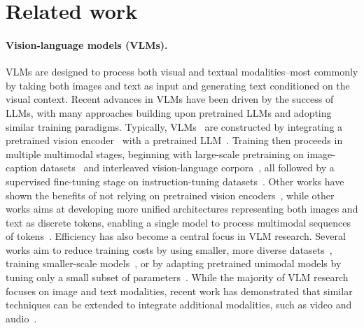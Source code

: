 \section{Related work}

\paragraph{Vision-language models (VLMs).} VLMs are designed to process both visual and textual modalities--most commonly by taking both images and text as input and generating text conditioned on the visual context. 
Recent advances in VLMs have been driven by the success of LLMs, with many approaches building upon pretrained LLMs and adopting similar training paradigms. 
Typically, VLMs~\citep{alayrac2022flamingo,laurenccon2024mattersidefics2,VILA} are constructed by integrating a pretrained vision encoder~\citep{radford2021learning,li2023siglip,fini2024multimodalaimv2} with a pretrained LLM~\citep{llama3_2modelcard,Mistral7B,wang2024qwen2}. 
Training then proceeds in multiple multimodal stages, beginning with large-scale pretraining on image-caption datasets~\citep{LAION-COCO,COYO-700M} and interleaved vision-language corpora~\citep{OBELICS,MMC4}, all followed by a supervised fine-tuning stage on instruction-tuning datasets~\citep{LLaVA-1.5,tong2024cambrian,laurenccon2024mattersidefics2}. 
Other works have shown the benefits of not relying on pretrained vision encoders~\citep{fuyu-8b,shukor2025scaling,diao2025evev2,diao2024unveiling}, while other works aims at developing more unified architectures representing both images and text as discrete tokens, enabling a single model to process multimodal sequences of tokens~\citep{wang2022ofa,shukor2023unival,team2024chameleon,lin2024moma}. 
Efficiency has also become a central focus in VLM research. Several works aim to reduce training costs by using smaller, more diverse datasets~\citep{LLaVA-1.5,InstructBLIP,bai2025qwen25vl,zhu2024minigpt,tong2024cambrian}, training smaller-scale models~\citep{marafioti2025smolvlm,moondream,minicmpv2024}, or by adapting pretrained unimodal models by tuning only a small subset of parameters~\citep{shukor2023epalm,vallaeys2024improveddepalm,MAPL,FROMAGe,tsimpoukelli2021multimodalfrozen,BLIP-2}. 
While the majority of VLM research focuses on image and text modalities, recent work has demonstrated that similar techniques can be extended to integrate additional modalities, such as video and audio~\citep{wang2025internvideo2,liu2024kangaroo,zhang2025videollama,kong2024audioflam}.


